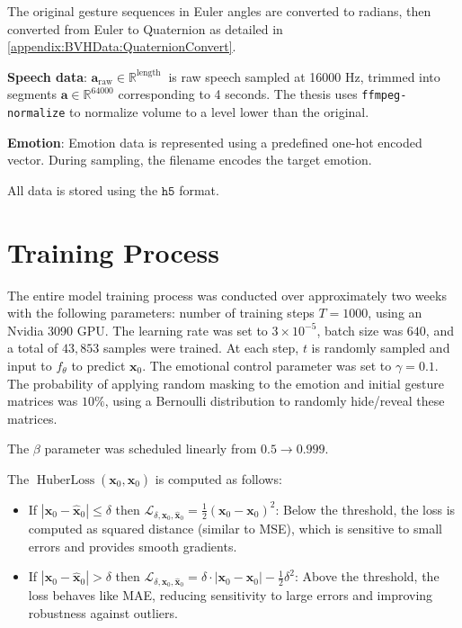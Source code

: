 The original gesture sequences in Euler angles are converted to radians, then converted from Euler to Quaternion as detailed in \autoref{appendix:BVHData:QuaternionConvert}.

\textbf{Speech data}: $\mathbf{a}_{\text{raw}} \in \mathbb{R}^{ \text{length } }$ is raw speech sampled at 16000 Hz, trimmed into segments $\mathbf{a} \in \mathbb{R}^{64000}$ corresponding to 4 seconds. The thesis uses \texttt{ffmpeg-normalize} to normalize volume to a level lower than the original.

\textbf{Emotion}: Emotion data is represented using a predefined one-hot encoded vector. During sampling, the filename encodes the target emotion.

All data is stored using the $\texttt{h5}$ format.

\section{Training Process}

The entire model training process was conducted over approximately two weeks with the following parameters: number of training steps $T = 1000$, using an Nvidia 3090 GPU. The learning rate was set to $3 \times 10^{-5}$, batch size was $640$, and a total of $43,853$ samples were trained. At each step, $t$ is randomly sampled and input to $f_{\theta}$ to predict $\mathbf{x}_{0}$. The emotional control parameter was set to $\gamma = 0.1$. The probability of applying random masking to the emotion and initial gesture matrices was $10\%$, using a Bernoulli distribution to randomly hide/reveal these matrices.

The $\beta$ parameter was scheduled linearly from $0.5 \rightarrow 0.999$.

The $\operatorname{HuberLoss} (\mathbf{x}_{0},  \hat{\mathbf{x}}_{0} )$ is computed as follows:

\begin{itemize}
\item If $|\mathbf{x}_0 - \hat{\mathbf{x}}_0| \leq \delta$ then $\mathcal{L}_{ \delta, \mathbf{x}_0, \hat{\mathbf{x}}_0} = \frac{1}{2} (\mathbf{x}_0 - \mathbf{x}_0)^2$: Below the threshold, the loss is computed as squared distance (similar to MSE), which is sensitive to small errors and provides smooth gradients.

\item If $|\mathbf{x}_0 - \hat{\mathbf{x}}_0| > \delta$ then $\mathcal{L}_{ \delta, \mathbf{x}_0, \hat{\mathbf{x}}_0}  =  \delta \cdot |\mathbf{x}_0 - \mathbf{x}_0| - \frac{1}{2} \delta^2$: Above the threshold, the loss behaves like MAE, reducing sensitivity to large errors and improving robustness against outliers.

\end{itemize}

